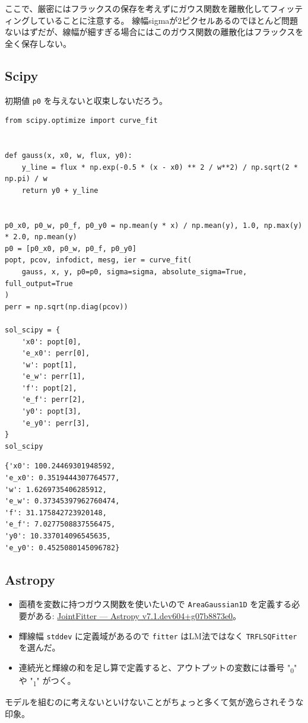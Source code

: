 \documentclass[a4paper, 8pt, notitlepage, uplatex, dvipdfmx]{jsarticle}
\begin{document}
ここで、厳密にはフラックスの保存を考えずにガウス関数を離散化してフィッティングしていることに注意する。
線幅sigmaが2ピクセルあるのでほとんど問題ないはずだが、線幅が細すぎる場合にはこのガウス関数の離散化はフラックスを全く保存しない。
\subsection{Scipy}
\label{sec:org80badb5}
初期値 \texttt{p0} を与えないと収束しないだろう。

\begin{verbatim}
from scipy.optimize import curve_fit


def gauss(x, x0, w, flux, y0):
    y_line = flux * np.exp(-0.5 * (x - x0) ** 2 / w**2) / np.sqrt(2 * np.pi) / w
    return y0 + y_line


p0_x0, p0_w, p0_f, p0_y0 = np.mean(y * x) / np.mean(y), 1.0, np.max(y) * 2.0, np.mean(y)
p0 = [p0_x0, p0_w, p0_f, p0_y0]
popt, pcov, infodict, mesg, ier = curve_fit(
    gauss, x, y, p0=p0, sigma=sigma, absolute_sigma=True, full_output=True
)
perr = np.sqrt(np.diag(pcov))

sol_scipy = {
    'x0': popt[0],
    'e_x0': perr[0],
    'w': popt[1],
    'e_w': perr[1],
    'f': popt[2],
    'e_f': perr[2],
    'y0': popt[3],
    'e_y0': perr[3],
}
sol_scipy
\end{verbatim}

\label{}
\begin{verbatim}
{'x0': 100.24469301948592,
'e_x0': 0.3519444307764577,
'w': 1.6269735406285912,
'e_w': 0.37345397962760474,
'f': 31.175842723920148,
'e_f': 7.0277508837556475,
'y0': 10.337014096545635,
'e_y0': 0.4525080145096782}
\end{verbatim}
\subsection{Astropy}
\label{sec:org2beccca}
\begin{itemize}
\item 面積を変数に持つガウス関数を使いたいので \texttt{AreaGaussian1D} を定義する必要がある: \href{https://docs.astropy.org/en/latest/modeling/jointfitter.html\#example-spectral-line}{JointFitter — Astropy v7.1.dev604+g07b8873e0}。
\item 輝線幅 \texttt{stddev} に定義域があるので \texttt{fitter} はLM法ではなく \texttt{TRFLSQFitter} を選んだ。
\item 連続光と輝線の和を足し算で定義すると、アウトプットの変数には番号 "\textsubscript{0}" や "\textsubscript{1}" がつく。
\end{itemize}
モデルを組むのに考えないといけないことがちょっと多くて気が逸らされそうな印象。
\end{document}
